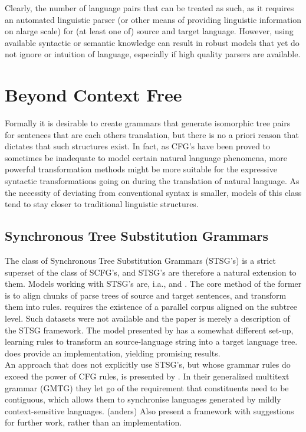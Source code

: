\documentclass{report}
\theoremstyle{break}
\begin{document}
Clearly, the number of language pairs that can be treated as such, as it requires an automated linguistic parser (or other means of providing linguistic information on alarge scale) for (at least one of) source and target language. However, using available syntactic or semantic knowledge can result in robust models that yet do not ignore or intuition of language, especially if high quality parsers are available.

\section{Beyond Context Free}
\label{sec:bcf}

Formally it is desirable to create grammars that generate isomorphic tree pairs for sentences that are each others translation, but there is no a priori reason that dictates that such structures exist. In fact, as CFG's have been proved to sometimes be inadequate to model certain natural language phenomena, more powerful transformation methods might be more suitable for the expressive syntactic transformations going on during the translation of natural language. As the necessity of deviating from conventional syntax is smaller, models of this class tend to stay closer to traditional linguistic structures.

\subsection{Synchronous Tree Substitution Grammars}

The class of Synchronous Tree Substitution Grammars (STSG's) is a strict superset of the class of SCFG's, and STSG's are therefore a natural extension to them. Models working with STSG's are, i.a., \cite{poutsma2000data} and \cite{galley2004s,galley2006scalable}. The core method of the former is to align chunks of parse trees of source and target sentences, and transform them into rules. \cite{poutsma2000data} requires the existence of a parallel corpus aligned on the subtree level. Such datasets were not available and the paper is merely a description of the STSG framework.  The model presented by \citeauthor{galley2004s} has a somewhat different set-up, learning rules to transform an source-language string into a target language tree. \cite{galley2006scalable} does provide an implementation, yielding promising results.\\
An approach that does not explicitly use STSG's, but whose grammar rules do exceed the power of CFG rules, is presented by \cite{melamed2004generalized}. In their generalized multitext grammar (GMTG) they let go of the requirement that constituents need to be contiguous, which allows them to synchronise languages generated by mildly context-sensitive languages. (anders) Also \citeauthor{melamed2004generalized} present a framework with suggestions for further work, rather than an implementation.
\end{document}
